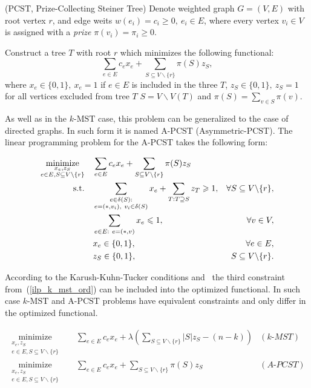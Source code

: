 \documentclass[11pt, tightenlines, twoside, onecolumn, nofloats, nobibnotes, nofootinbib, superscriptaddress, noshowpacks, centertags]{revtex4}
\begin{document}
\begin{definition}{($\text{PCST}$, Prize-Collecting Steiner Tree)}
    Denote weighted graph $G=(V,E)$ with root vertex $r$, and edge weits $w(e_i)=c_i\geqslant 0,~e_i\in E$, where every vertex $v_i \in V$ is assigned with a \emph{prize} $\pi(v_i)=\pi_i\geqslant 0$.
    
    Construct a tree $T$ with root $r$ which minimizes the following functional: \[\sum\limits_{e\in E}c_ex_e +  \sum\limits_{S\subseteq V\backslash\{r\}}\pi(S)z_S,\]
    where $x_e\in\{0, 1\},~x_e=1$ if $e\in E$ is included in the three $T$, $z_S\in\{0, 1\},~z_S=1$ for all vertices excluded from tree $T$ $S = V\backslash V(T)$ and $\pi(S)= \sum_{v\in S}\pi(v)$.
\end{definition}
As well as in the $k\text{-MST}$ case, this problem can be generalized to the case of directed graphs. In such form it is named $\text{A}$-$\text{PCST}$ ($\text{Asymmetric}$-$\text{PCST}$). The linear programming problem for the $\text{A}$-$\text{PCST}$ takes the following form:

\begin{align}
\underset{\substack{x_e,z_S \\ e\in E, S\subseteq V\backslash \{r\}}}{\text{minimize}}\quad & \sum\limits_{e\in E}c_ex_e +  \sum\limits_{S\subseteq V\backslash\{r\}}\pi(S)z_S \nonumber\\
\text{s.t.\quad} & \sum\limits_{\substack{e\in\delta(S):\\e=(\ast,v_i),~ v_i\in\delta(S)}}x_e + \sum\limits_{T:T\supseteq S}z_T\geqslant 1, & \forall S\subseteq V\backslash \{r\},\nonumber\\
& \sum\limits_{e\in E:~e=(\ast,v)}x_e\leqslant 1, & \forall v\in V,
\label{ilp_pcst_ord}\\
& x_e\in\{0,1\}, &\forall e\in E,\nonumber\\
& z_S\in\{0,1\}, & S\subseteq V\backslash \{r\}.\nonumber
\end{align}

According to the Karush-Kuhn-Tucker conditions and~\cite{Ras2017} the third constraint from~(\ref{ilp_k_mst_ord}) can be included into the optimized functional. In such case $k\text{-MST}$ and $\text{A}$-$\text{PCST}$ problems have equivalent constraints and only differ in the optimized functional.

\begin{align*}
\underset{\substack{x_e,z_S \\ e\in E, S\subseteq V\backslash \{r\}}}{\text{minimize}}\quad & \sum\limits_{e\in E}c_ex_e +  \lambda\left(\sum\limits_{S\subseteq V\backslash \{r\}}|S|z_S - (n-k)\right) & (k\text{-}MST)  \nonumber\\
\underset{\substack{x_e,z_S \\ e\in E, S\subseteq V\backslash \{r\}}}{\text{minimize}}\quad & \sum\limits_{e\in E}c_ex_e +  \sum\limits_{S\subseteq V\backslash\{r\}}\pi(S)z_S & (A\text{-}PCST) \nonumber\\
\end{align*}
\end{document}
